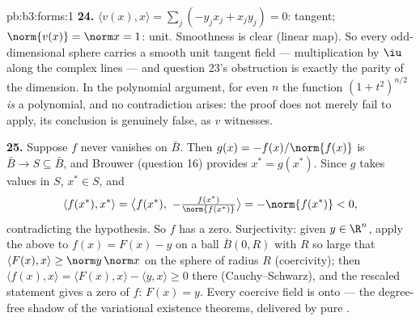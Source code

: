 \begin{solution}{pb:b3:forms:1}
\textbf{24.} $\langle v(x), x\rangle = \sum_j(-y_jx_j +
x_jy_j) = 0$: tangent; $\norm{v(x)} = \norm x = 1$: unit.
Smoothness is clear (linear map). So every odd-dimensional
sphere carries a smooth unit tangent field --- multiplication
by $\iu$ along the complex lines --- and question 23's
obstruction is exactly the parity of the dimension. In the
polynomial argument, for even $n$ the function $(1 +
t^2)^{n/2}$ \emph{is} a polynomial, and no contradiction
arises: the proof does not merely fail to apply, its
conclusion is genuinely false, as $v$ witnesses.

\textbf{25.} Suppose $f$ never vanishes on $\bar B$. Then
$g(x) = -f(x)/\norm{f(x)}$ is  $\bar B \to S
\subseteq \bar B$, and Brouwer (question 16) provides $x^* =
g(x^*)$. Since $g$ takes values in $S$, $x^* \in S$, and
\[
\langle f(x^*), x^*\rangle = \bigl\langle f(x^*),\
-\tfrac{f(x^*)}{\norm{f(x^*)}}\bigr\rangle
= -\norm{f(x^*)} < 0,
\]
contradicting the  hypothesis. So $f$ has a zero.
Surjectivity: given $y \in \R^n$, apply the above to $f(x) =
F(x) - y$ on a ball $\bar B(0, R)$ with $R$ so large that
$\langle F(x), x\rangle \geq \norm y\,\norm x$ on the sphere
of radius $R$ (coercivity); then $\langle f(x), x\rangle =
\langle F(x), x\rangle - \langle y, x\rangle \geq 0$ there
(Cauchy--Schwarz), and the rescaled statement gives a zero
of $f$: $F(x) = y$. Every coercive  field is onto
--- the degree-free shadow of the variational existence
theorems, delivered by pure .
\end{solution}
